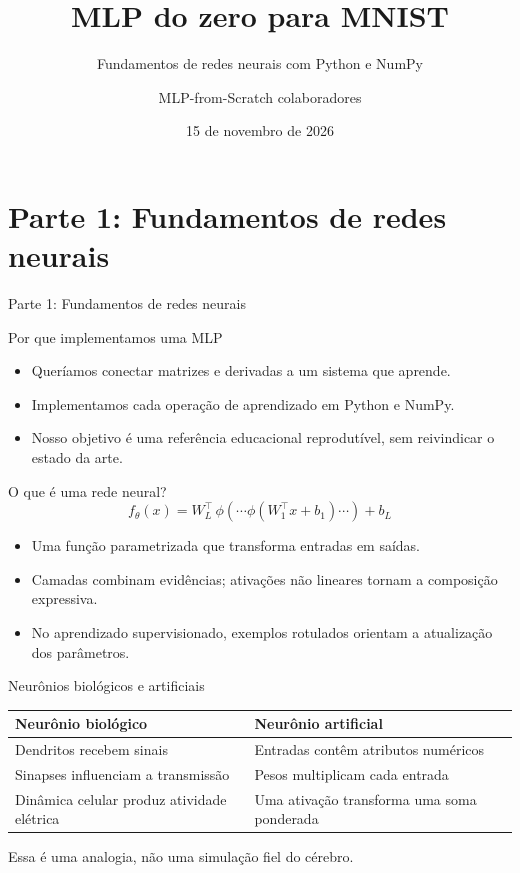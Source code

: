 \documentclass[aspectratio=169,10pt]{beamer}
\title{MLP do zero para MNIST}
\subtitle{Fundamentos de redes neurais com Python e NumPy}
\author{MLP-from-Scratch colaboradores}
\date{15 de novembro de 2026}
\begin{document}
\begin{frame}\titlepage\end{frame}
\section{Parte 1: Fundamentos de redes neurais}
\begin{frame}{Parte 1: Fundamentos de redes neurais}
\tableofcontents[currentsection]\end{frame}

\begin{frame}{Por que implementamos uma MLP}
\begin{itemize}
\item Queríamos conectar matrizes e derivadas a um sistema que aprende.
\item Implementamos cada operação de aprendizado em Python e NumPy.
\item Nosso objetivo é uma referência educacional reprodutível, sem reivindicar o estado da arte.
\end{itemize}
\end{frame}

\begin{frame}{O que é uma rede neural?}
\[f_{\theta}(x)=W_L^{\top}\,\phi(\cdots\phi(W_1^{\top}x+b_1)\cdots)+b_L\]\begin{itemize}
\item Uma função parametrizada que transforma entradas em saídas.
\item Camadas combinam evidências; ativações não lineares tornam a composição expressiva.
\item No aprendizado supervisionado, exemplos rotulados orientam a atualização dos parâmetros.
\end{itemize}

\end{frame}

\begin{frame}{Neurônios biológicos e artificiais}
\begin{tabular}{p{}p{}}\toprule Neurônio biológico & Neurônio artificial\\\midrule Dendritos recebem sinais & Entradas contêm atributos numéricos\\[6pt] Sinapses influenciam a transmissão & Pesos multiplicam cada entrada\\[6pt] Dinâmica celular produz atividade elétrica & Uma ativação transforma uma soma ponderada\\\bottomrule\end{tabular}\par\vspace{10pt}Essa é uma analogia, não uma simulação fiel do cérebro.\end{frame}
\end{document}
